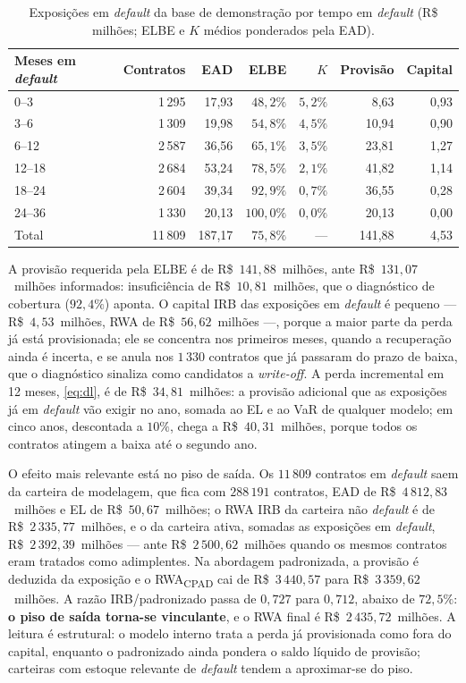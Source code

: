 \documentclass[11pt,a4paper]{article}
\begin{document}
\begin{table}[H]
\centering
\small
\begin{tabular}{lrrrrrr}
\toprule
Meses em \emph{default} & Contratos & EAD & ELBE & $K$ & Provisão & Capital\\
\midrule
0--3 & 1\,295 & 17{,}93 & $48{,}2\%$ & $5{,}2\%$ & 8{,}63 & 0{,}93\\
3--6 & 1\,309 & 19{,}98 & $54{,}8\%$ & $4{,}5\%$ & 10{,}94 & 0{,}90\\
6--12 & 2\,587 & 36{,}56 & $65{,}1\%$ & $3{,}5\%$ & 23{,}81 & 1{,}27\\
12--18 & 2\,684 & 53{,}24 & $78{,}5\%$ & $2{,}1\%$ & 41{,}82 & 1{,}14\\
18--24 & 2\,604 & 39{,}34 & $92{,}9\%$ & $0{,}7\%$ & 36{,}55 & 0{,}28\\
24--36 & 1\,330 & 20{,}13 & $100{,}0\%$ & $0{,}0\%$ & 20{,}13 & 0{,}00\\
\midrule
Total & 11\,809 & 187{,}17 & $75{,}8\%$ & --- & 141{,}88 & 4{,}53\\
\bottomrule
\end{tabular}
\caption{Exposições em \emph{default} da base de demonstração por tempo em \emph{default} (R\$ milhões; ELBE e $K$ médios ponderados pela EAD).}
\label{tab:caso2-default}
\end{table}

A provisão requerida pela ELBE é de R\$~$141{,}88$~milhões, ante R\$~$131{,}07$~milhões informados: insuficiência de R\$~$10{,}81$~milhões, que o diagnóstico de cobertura ($92{,}4\%$) aponta. O capital IRB das exposições em \emph{default} é pequeno --- R\$~$4{,}53$~milhões, RWA de R\$~$56{,}62$~milhões ---, porque a maior parte da perda já está provisionada; ele se concentra nos primeiros meses, quando a recuperação ainda é incerta, e se anula nos $1\,330$ contratos que já passaram do prazo de baixa, que o diagnóstico sinaliza como candidatos a \emph{write-off}. A perda incremental em 12 meses, \eqref{eq:dl}, é de R\$~$34{,}81$~milhões: a provisão adicional que as exposições já em \emph{default} vão exigir no ano, somada ao EL e ao VaR de qualquer modelo; em cinco anos, descontada a $10\%$, chega a R\$~$40{,}31$~milhões, porque todos os contratos atingem a baixa até o segundo ano.

O efeito mais relevante está no piso de saída. Os $11\,809$ contratos em \emph{default} saem da carteira de modelagem, que fica com $288\,191$ contratos, EAD de R\$~$4\,812{,}83$~milhões e EL de R\$~$50{,}67$~milhões; o RWA IRB da carteira não \emph{default} é de R\$~$2\,335{,}77$~milhões, e o da carteira ativa, somadas as exposições em \emph{default}, R\$~$2\,392{,}39$~milhões --- ante R\$~$2\,500{,}62$~milhões quando os mesmos contratos eram tratados como adimplentes. Na abordagem padronizada, a provisão é deduzida da exposição e o RWA\textsubscript{CPAD} cai de R\$~$3\,440{,}57$ para R\$~$3\,359{,}62$~milhões. A razão IRB/padronizado passa de $0{,}727$ para $0{,}712$, abaixo de $72{,}5\%$: \textbf{o piso de saída torna-se vinculante}, e o RWA final é R\$~$2\,435{,}72$~milhões. A leitura é estrutural: o modelo interno trata a perda já provisionada como fora do capital, enquanto o padronizado ainda pondera o saldo líquido de provisão; carteiras com estoque relevante de \emph{default} tendem a aproximar-se do piso.
\end{document}

